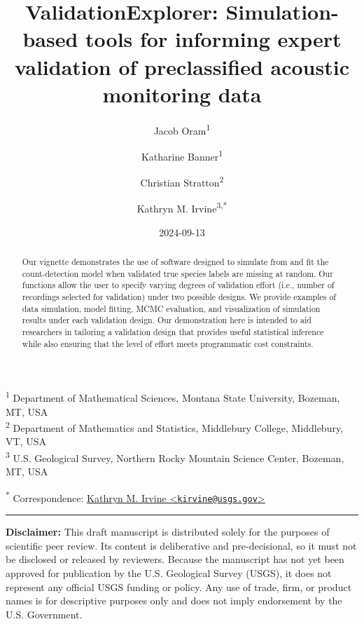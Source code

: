 \documentclass[
]{article}
\title{ValidationExplorer: Simulation-based tools for informing expert validation of preclassified acoustic monitoring data}
\author{Jacob Oram\textsuperscript{1} \and Katharine Banner\textsuperscript{1} \and Christian Stratton\textsuperscript{2} \and Kathryn M. Irvine\textsuperscript{3,*}}
\date{2024-09-13}
\begin{document}
\maketitle
\begin{abstract}
Our vignette demonstrates the use of software designed to simulate from and fit the count-detection model when validated true species labels are missing at random. Our functions allow the user to specify varying degrees of validation effort (i.e., number of recordings selected for validation) under two possible designs. We provide examples of data simulation, model fitting, MCMC evaluation, and visualization of simulation results under each validation design. Our demonstration here is intended to aid researchers in tailoring a validation design that provides useful statistical inference while also ensuring that the level of effort meets programmatic cost constraints. \vfill
\end{abstract}

\textsuperscript{1} Department of Mathematical Sciences, Montana State University, Bozeman, MT, USA\\
\textsuperscript{2} Department of Mathematics and Statistics, Middlebury College, Middlebury, VT, USA\\
\textsuperscript{3} U.S. Geological Survey, Northern Rocky Mountain Science Center, Bozeman, MT, USA

\textsuperscript{*} Correspondence: \href{mailto:kirvine@usgs.gov}{Kathryn M. Irvine \textless{}\href{mailto:kirvine@usgs.gov}{\nolinkurl{kirvine@usgs.gov}}\textgreater{}}

\begin{center}\rule{0.5\linewidth}{0.5pt}\end{center}

\textbf{Disclaimer:} This draft manuscript is distributed solely for the purposes of scientific peer review. Its content is deliberative and pre-decisional, so it must not be disclosed or released by reviewers. Because the manuscript has not yet been approved for publication by the U.S. Geological Survey (USGS), it does not represent any official USGS funding or policy. Any use of trade, firm, or product names is for descriptive purposes only and does not imply endorsement by the U.S. Government.

\newpage

\setcounter{tocdepth}{4}
\tableofcontents

\newpage

\doublespacing
\end{document}

